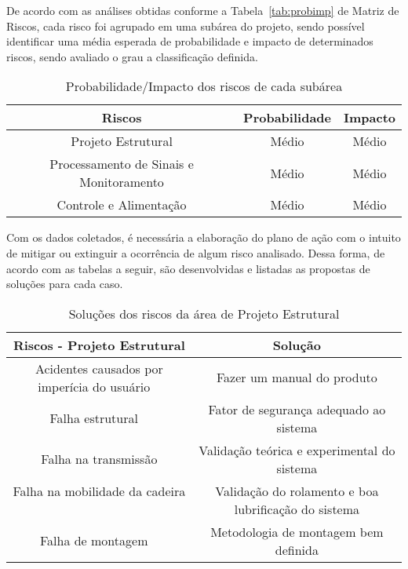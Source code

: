 De acordo com as análises obtidas conforme a Tabela~\ref{tab:probimp} de Matriz de Riscos,
cada risco foi agrupado em uma subárea do projeto, sendo possível identificar uma
média esperada de probabilidade e impacto de determinados riscos, sendo avaliado o
grau a classificação definida.

\begin{table}[h]
\centering
\vspace{0.5cm}
\begin{tabular}{|c|c|c|}
\hline
Riscos                    & Probabilidade & Impacto \\
\hline
Projeto Estrutural                 & Médio         & Médio \\
Processamento de Sinais e Monitoramento  & Médio         & Médio \\
Controle e Alimentação               & Médio         & Médio \\
\hline
\end{tabular}
\caption{Probabilidade/Impacto dos riscos de cada subárea}
\label{tab:probimparea}
\end{table}

Com os dados coletados, é necessária a elaboração do plano de ação com o
intuito de mitigar ou extinguir a ocorrência de algum risco analisado. Dessa forma, de
acordo com as tabelas a seguir, são desenvolvidas e listadas as propostas de soluções
para cada caso.

\begin{table}[h]
\centering
\vspace{0.5cm}
\begin{tabular}{|c|c|}
\hline
Riscos - Projeto Estrutural                                     & Solução \\
\hline
Acidentes causados por imperícia do usuário            & Fazer um manual do produto \\
Falha estrutural                                       & Fator de segurança adequado ao sistema \\
Falha na transmissão                                   & Validação teórica e experimental do sistema \\
Falha na mobilidade da cadeira                         & Validação do rolamento e boa lubrificação do sistema \\
Falha de montagem                                      & Metodologia de montagem bem definida \\
\hline
\end{tabular}
\caption{Soluções dos riscos da área de Projeto Estrutural}
\label{tab:riscosubareaest}
\end{table}

